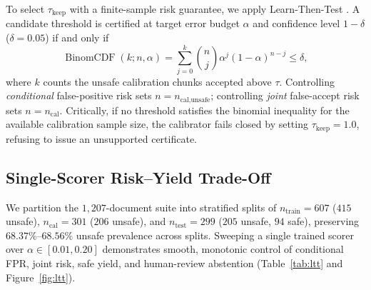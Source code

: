 \documentclass{article}
\begin{document}
To select $\tau_{\text{keep}}$ with a finite-sample risk guarantee, we apply Learn-Then-Test \citep{angelopoulos2021ltt}. A candidate threshold is certified at target error budget $\alpha$ and confidence level $1-\delta$ ($\delta=0.05$) if and only if
\begin{equation}
\operatorname{BinomCDF}(k; n, \alpha) = \sum_{j=0}^{k} \binom{n}{j} \alpha^j (1-\alpha)^{n-j} \le \delta,
\end{equation}
where $k$ counts the unsafe calibration chunks accepted above $\tau$. Controlling \emph{conditional} false-positive risk sets $n = n_{\text{cal,unsafe}}$; controlling \emph{joint} false-accept risk sets $n = n_{\text{cal}}$. Critically, if no threshold satisfies the binomial inequality for the available calibration sample size, the calibrator fails closed by setting $\tau_{\text{keep}} = 1.0$, refusing to issue an unsupported certificate.

\subsection{Single-Scorer Risk--Yield Trade-Off}
We partition the $1{,}207$-document suite into stratified splits of $n_{\text{train}}=607$ ($415$ unsafe), $n_{\text{cal}}=301$ ($206$ unsafe), and $n_{\text{test}}=299$ ($205$ unsafe, $94$ safe), preserving $68.37\%$--$68.56\%$ unsafe prevalence across splits. Sweeping a single trained scorer over $\alpha \in [0.01, 0.20]$ demonstrates smooth, monotonic control of conditional FPR, joint risk, safe yield, and human-review abstention (Table~\ref{tab:ltt} and Figure~\ref{fig:ltt}).
\end{document}
